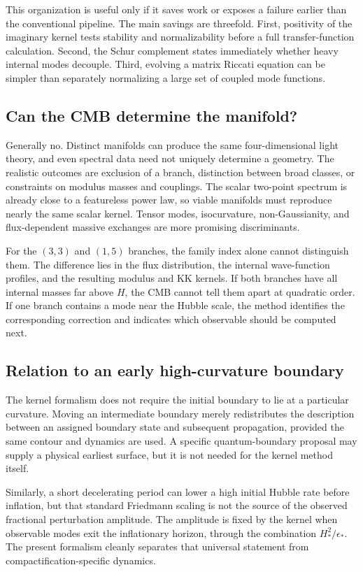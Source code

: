 \documentclass[aps,prd,twocolumn,superscriptaddress,nofootinbib,longbibliography,floatfix]{revtex4-2}
\begin{document}
This organization is useful only if it saves work or exposes a failure earlier than the conventional pipeline. The main savings are threefold. First, positivity of the imaginary kernel tests stability and normalizability before a full transfer-function calculation. Second, the Schur complement states immediately whether heavy internal modes decouple. Third, evolving a matrix Riccati equation can be simpler than separately normalizing a large set of coupled mode functions.

\subsection{Can the CMB determine the manifold?}
Generally no. Distinct manifolds can produce the same four-dimensional light theory, and even spectral data need not uniquely determine a geometry. The realistic outcomes are exclusion of a branch, distinction between broad classes, or constraints on modulus masses and couplings. The scalar two-point spectrum is already close to a featureless power law, so viable manifolds must reproduce nearly the same scalar kernel. Tensor modes, isocurvature, non-Gaussianity, and flux-dependent massive exchanges are more promising discriminants.

For the $(3,3)$ and $(1,5)$ branches, the family index alone cannot distinguish them. The difference lies in the flux distribution, the internal wave-function profiles, and the resulting modulus and KK kernels. If both branches have all internal masses far above $H$, the CMB cannot tell them apart at quadratic order. If one branch contains a mode near the Hubble scale, the method identifies the corresponding correction and indicates which observable should be computed next.

\subsection{Relation to an early high-curvature boundary}
The kernel formalism does not require the initial boundary to lie at a particular curvature. Moving an intermediate boundary merely redistributes the description between an assigned boundary state and subsequent propagation, provided the same contour and dynamics are used. A specific quantum-boundary proposal may supply a physical earliest surface, but it is not needed for the kernel method itself.

Similarly, a short decelerating period can lower a high initial Hubble rate before inflation, but that standard Friedmann scaling is not the source of the observed fractional perturbation amplitude. The amplitude is fixed by the kernel when observable modes exit the inflationary horizon, through the combination $H_*^2/\epsilon_*$. The present formalism cleanly separates that universal statement from compactification-specific dynamics.
\end{document}
